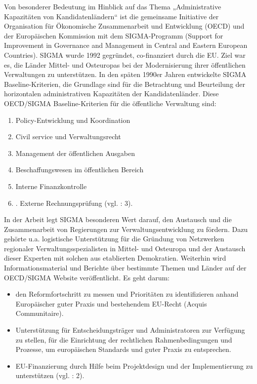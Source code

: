 Von besonderer Bedeutung im Hinblick auf das Thema „Administrative Kapazitäten von Kandidatenländern“ ist die gemeinsame Initiative der Organisation für Ökonomische Zusammenarbeit und Entwicklung (OECD) und der Europäischen Kommission mit dem SIGMA-Programm (Support for Improvement in Governance and Management in Central and Eastern European Countries). SIGMA wurde 1992 gegründet, co-finanziert durch die EU. Ziel war es, die Länder Mittel- und Osteuropas bei der Modernisierung ihrer öffentlichen Verwaltungen zu unterstützen. In den späten 1990er Jahren entwickelte SIGMA Baseline-Kriterien, die Grundlage sind für die Betrachtung und Beurteilung der horizontalen administrativen Kapazitäten der Kandidatenländer. Diese OECD/SIGMA Baseline-Kriterien für die öffentliche Verwaltung sind: 
\begin{enumerate}
\item Policy-Entwicklung und Koordination 
\item Civil service und Verwaltungsrecht
\item Management der öffentlichen Ausgaben
\item Beschaffungswesen im öffentlichen Bereich
\item Interne Finanzkontrolle
\item. Externe Rechnungsprüfung (vgl. \cite{cardona09}: 3).
\end{enumerate}
In der Arbeit legt SIGMA besonderen Wert darauf, den Austausch und die Zusammenarbeit von Regierungen zur Verwaltungsentwicklung zu fördern. Dazu gehörte u.a. logistische Unterstützung für die Gründung von Netzwerken regionaler Verwaltungsspezialisten in Mittel- und Osteuropa und der Austausch dieser Experten mit solchen aus etablierten Demokratien. Weiterhin wird Informationsmaterial und Berichte über bestimmte Themen und Länder auf der OECD/SIGMA Website veröffentlicht. Es geht darum:
\begin{itemize}
\item den Reformfortschritt zu messen und Prioritäten zu identifizieren anhand Europäischer guter Praxis und bestehendem EU-Recht (Acquis Communitaire). 
\item Unterstützung für Entscheidungsträger und Administratoren zur Verfügung zu stellen, für die Einrichtung der rechtlichen Rahmenbedingungen und Prozesse, um europäischen Standards und guter Praxis zu entsprechen.
\item EU-Finanzierung durch Hilfe beim Projektdesign und der Implementierung zu unterstützen (vgl. \cite{oecd99}: 2).
\end{itemize}
